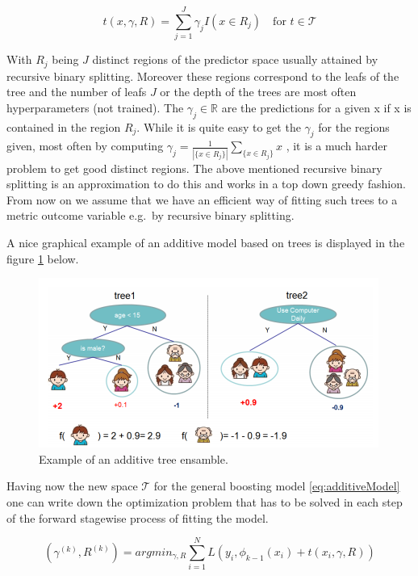 \documentclass[
]{book}
\begin{document}
\begin{equation}
  t(x, \gamma, R) = \sum_{j=1}^J \gamma_j I(x \in R_j) \quad \text{for  } t \in \mathcal{T}
  \label{eq:treeDef}
\end{equation}

With \(R_j\) being \(J\) distinct regions of the predictor space usually attained by recursive binary splitting. Moreover these regions correspond to the leafs of the tree and the number of leafs \(J\) or the depth of the trees are most often hyperparameters (not trained). The \(\gamma_j \in \mathbb{R}\) are the predictions for a given x if x is contained in the region \(R_j\). While it is quite easy to get the \(\gamma_j\) for the regions given, most often by computing \(\gamma_j = \frac{1}{|\{x \in R_j\}|} \sum_{\{x \in R_j\}} x\) , it is a much harder problem to get good distinct regions. The above mentioned recursive binary splitting is an approximation to do this and works in a top down greedy fashion.\citep{elements} From now on we assume that we have an efficient way of fitting such trees to a metric outcome variable e.g.~by recursive binary splitting.

A nice graphical example of an additive model based on trees is displayed in the figure \ref{fig:exampleAdditiveTree} below.\citep{xgboostPaper}

\begin{figure}

{\centering \includegraphics[width=0.7\linewidth]{_pictures/boosting_easy} 

}

\caption{Example of an additive tree ensamble.}\label{fig:exampleAdditiveTree}
\end{figure}

Having now the new space \(\mathcal{T}\) for the general boosting model \eqref{eq:additiveModel} one can write down the optimization problem that has to be solved in each step of the forward stagewise process of fitting the model.

\begin{equation}
  (\gamma^{(k)},R^{(k)}) = argmin_{\gamma,R} \sum_{i=1}^N L(y_i, \phi_{k-1}(x_i) + t(x_i,\gamma,R))
  \label{eq:oneStepTreeBoost}
\end{equation}
\end{document}
